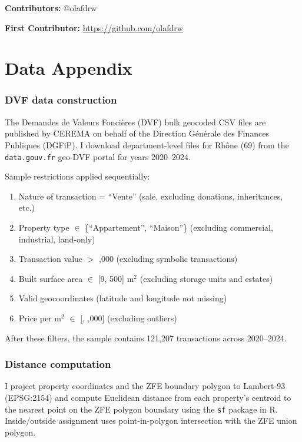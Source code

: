 \documentclass[12pt]{article}
\begin{document}
\noindent\textbf{Contributors:} @olafdrw

\noindent\textbf{First Contributor:} \url{https://github.com/olafdrw}

\label{apep_main_text_end}
\newpage


\newpage
\appendix

\section{Data Appendix}

\subsubsection*{DVF data construction} The Demandes de Valeurs Fonci\`eres (DVF) bulk geocoded CSV files are published by CEREMA on behalf of the Direction G\'en\'erale des Finances Publiques (DGFiP). I download department-level files for Rh\^one (69) from the \texttt{data.gouv.fr} geo-DVF portal for years 2020--2024.

Sample restrictions applied sequentially:
\begin{enumerate}
\item Nature of transaction = ``Vente'' (sale, excluding donations, inheritances, etc.)
\item Property type $\in$ \{``Appartement'', ``Maison''\} (excluding commercial, industrial, land-only)
\item Transaction value $>$ ,000 (excluding symbolic transactions)
\item Built surface area $\in$ [9, 500] m$^2$ (excluding storage units and estates)
\item Valid geocoordinates (latitude and longitude not missing)
\item Price per m$^2$ $\in$ [, ,000] (excluding outliers)
\end{enumerate}

After these filters, the sample contains 121,207 transactions across 2020--2024.

\subsubsection*{Distance computation} I project property coordinates and the ZFE boundary polygon to Lambert-93 (EPSG:2154) and compute Euclidean distance from each property's centroid to the nearest point on the ZFE polygon boundary using the \texttt{sf} package in R. Inside/outside assignment uses point-in-polygon intersection with the ZFE union polygon.
\end{document}
